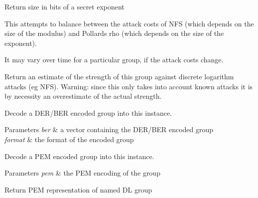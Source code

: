 Return size in bits of a secret exponent

This attempts to balance between the attack costs of N\+FS (which depends on the size of the modulus) and Pollard\textquotesingle{}s rho (which depends on the size of the exponent).

It may vary over time for a particular group, if the attack costs change.

Return an estimate of the strength of this group against discrete logarithm attacks (eg N\+FS). Warning\+: since this only takes into account known attacks it is by necessity an overestimate of the actual strength.

Decode a D\+E\+R/\+B\+ER encoded group into this instance. 
\begin{DoxyParams}{Parameters}
{\em ber} & a vector containing the D\+E\+R/\+B\+ER encoded group \\
\hline
{\em format} & the format of the encoded group\\
\hline
\end{DoxyParams}
Decode a P\+EM encoded group into this instance. 
\begin{DoxyParams}{Parameters}
{\em pem} & the P\+EM encoding of the group\\
\hline
\end{DoxyParams}
Return P\+EM representation of named DL group

